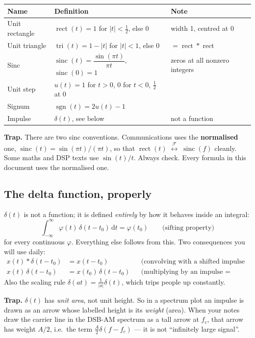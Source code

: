 \documentclass[11pt,a4paper]{article}
\newcommand{\FT}{\;\stackrel{\mathcal{F}}{\longleftrightarrow}\;}
\newcommand{\sinc}{\operatorname{sinc}}
\newcommand{\rect}{\operatorname{rect}}
\newcommand{\tri}{\operatorname{tri}}
\newcommand{\sgn}{\operatorname{sgn}}
\newcommand{\dd}{\,\mathrm{d}}
\begin{document}
\begin{center}
\renewcommand{\arraystretch}{1.5}
\begin{tabular}{@{}lll@{}}
\toprule
\textbf{Name} & \textbf{Definition} & \textbf{Note} \\
\midrule
Unit rectangle & $\rect(t)=1$ for $|t|<\tfrac12$, else $0$ & width 1, centred at 0 \\
Unit triangle & $\tri(t)=1-|t|$ for $|t|<1$, else $0$ & $=\rect*\rect$ \\
Sinc & $\sinc(t)=\dfrac{\sin(\pi t)}{\pi t}$, $\sinc(0)=1$ & zeros at all nonzero integers \\
Unit step & $u(t)=1$ for $t>0$, $0$ for $t<0$, $\tfrac12$ at $0$ & \\
Signum & $\sgn(t)=2u(t)-1$ & \\
Impulse & $\delta(t)$, see below & not a function \\
\bottomrule
\end{tabular}
\end{center}

\begin{trapbox}
\textbf{Trap.} There are two sinc conventions. Communications uses the \textbf{normalised} one,
$\sinc(t)=\sin(\pi t)/(\pi t)$, so that $\rect(t)\FT\sinc(f)$ cleanly. Some maths and DSP texts use
$\sin(t)/t$. Always check. Every formula in this document uses the normalised one.
\end{trapbox}

\subsection{The delta function, properly}
$\delta(t)$ is not a function; it is defined \emph{entirely} by how it behaves inside an integral:
\[
\int_{-\infty}^{\infty}\varphi(t)\,\delta(t-t_0)\dd t=\varphi(t_0)\qquad\text{(sifting property)}
\]
for every continuous $\varphi$. Everything else follows from this. Two consequences you will use daily:
\begin{align}
x(t)*\delta(t-t_0)&=x(t-t_0) &&\text{(convolving with a shifted impulse = shifting)}\\
x(t)\,\delta(t-t_0)&=x(t_0)\,\delta(t-t_0) &&\text{(multiplying by an impulse = sampling)}
\end{align}
Also the scaling rule $\delta(at)=\frac{1}{|a|}\delta(t)$, which trips people up constantly.

\begin{trapbox}
\textbf{Trap.} $\delta(t)$ has \emph{unit area}, not unit height. So in a spectrum plot an impulse is drawn as
an arrow whose labelled height is its \emph{weight} (area). When your notes draw the carrier line in the
DSB-AM spectrum as a tall arrow at $f_c$, that arrow has weight $A/2$, i.e.\ the term
$\frac{A}{2}\delta(f-f_c)$ --- it is not ``infinitely large signal''.
\end{trapbox}
\end{document}
